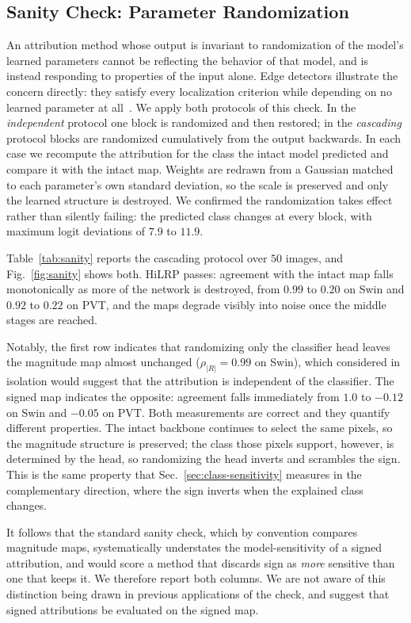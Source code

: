 \documentclass[lettersize,journal]{IEEEtran}
\theoremstyle{definition}
\theoremstyle{plain}
\begin{document}
\subsection{Sanity Check: Parameter Randomization}
\label{sec:sanity}
An attribution method whose output is invariant to randomization of the model's
learned parameters cannot be reflecting the behavior of that model, and is
instead responding to properties of the input alone. Edge detectors illustrate
the concern directly: they satisfy every localization criterion while depending
on no learned parameter at all~\cite{adebayo2018sanity}. We apply both protocols
of this check. In the \emph{independent} protocol one block is randomized and
then restored; in the \emph{cascading} protocol blocks are randomized
cumulatively from the output backwards. In each case we recompute the
attribution for the class the intact model predicted and compare it with the
intact map. Weights are redrawn from a Gaussian matched to each parameter's own
standard deviation, so the scale is preserved and only the learned structure is
destroyed. We confirmed the randomization takes effect rather than silently
failing: the predicted class changes at every block, with maximum logit
deviations of $7.9$ to $11.9$.

Table~\ref{tab:sanity} reports the cascading protocol over $50$ images, and
Fig.~\ref{fig:sanity} shows both. HiLRP passes: agreement with the intact map
falls monotonically as more of the network is destroyed, from $0.99$ to $0.20$
on Swin and $0.92$ to $0.22$ on PVT, and the maps degrade visibly into noise
once the middle stages are reached.

Notably, the first row indicates that randomizing only the classifier head
leaves the magnitude map almost unchanged ($\rho_{|R|}=0.99$ on Swin), which
considered in isolation would suggest that the attribution is independent of the
classifier. The signed map indicates the opposite: agreement falls immediately
from $1.0$ to $-0.12$ on Swin and $-0.05$ on PVT. Both measurements are correct
and they quantify different properties. The intact backbone continues to select
the same pixels, so the magnitude structure is preserved; the class those pixels
support, however, is determined by the head, so randomizing the head inverts and
scrambles the sign. This is the same property that
Sec.~\ref{sec:class-sensitivity} measures in the complementary direction, where
the sign inverts when the explained class changes.

It follows that the standard sanity check, which by convention compares
magnitude maps, systematically understates the model-sensitivity of a signed
attribution, and would score a method that discards sign as \emph{more}
sensitive than one that keeps it. We therefore report both columns. We are not
aware of this distinction being drawn in previous applications of the check, and
suggest that signed attributions be evaluated on the signed map.
\end{document}
